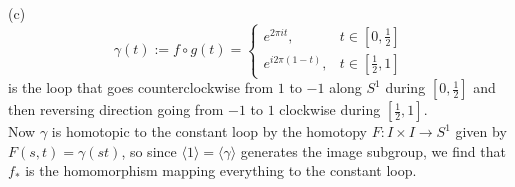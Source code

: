 \documentclass[a4paper]{article}
\begin{document}
(c) 
\[
\gamma(t) := f \circ g(t) =
\begin{cases}
    e^{2 \pi i t}, & t \in \left[ 0, \frac{1}{2} \right] \\
    e^{i 2 \pi (1-t)}, & t \in \left[ \frac{1}{2},1 \right] 
\end{cases}
\] 
is the loop that goes counterclockwise from $1$ to $-1$ along $S^{1}$ 
during $\left[ 0, \frac{1}{2} \right] $ and then
reversing direction going from $-1$ to $1$ clockwise during $\left[
\frac{1}{2},1 \right] $.\\
Now $\gamma$ is homotopic to the constant loop by
the homotopy
$F  \colon I \times I \to S^{1}$ given by
$F(s,t) =
\gamma(st)$, so since $\langle 1 \rangle 
= \langle \gamma \rangle $ generates the image subgroup, we find that
$f_*$ is the homomorphism mapping everything to the constant loop.
\end{document}
